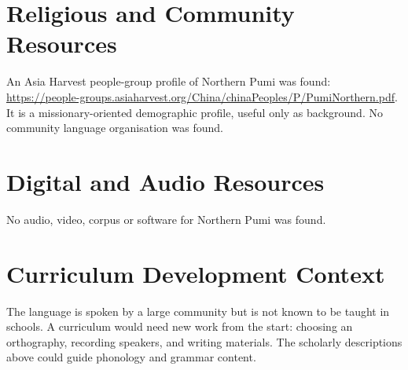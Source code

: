 \documentclass[12pt]{article}
\begin{document}
\section{Religious and Community Resources}
An Asia Harvest people-group profile of Northern Pumi was found: \url{https://people-groups.asiaharvest.org/China/chinaPeoples/P/PumiNorthern.pdf}. It is a missionary-oriented demographic profile, useful only as background. No community language organisation was found.

\section{Digital and Audio Resources}
No audio, video, corpus or software for Northern Pumi was found.

\section{Curriculum Development Context}
The language is spoken by a large community but is not known to be taught in schools. A curriculum would need new work from the start: choosing an orthography, recording speakers, and writing materials. The scholarly descriptions above could guide phonology and grammar content.
\end{document}
